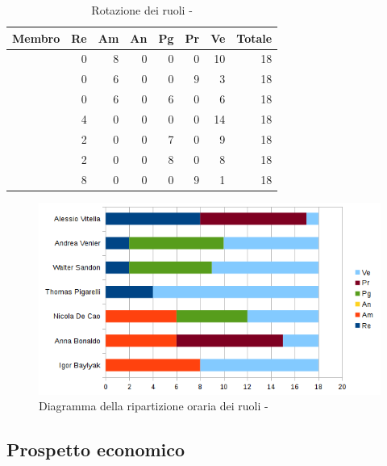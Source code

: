 \documentclass[12pt,a4paper]{article}
\begin{document}
\begin{table}[H]
	\begin{center}
		\begin{tabular}{l r r r r r r r}
			\toprule
			\textbf{Membro}	&	\textbf{Re}	&	\textbf{Am}	& \textbf{An} & \textbf{Pg} & \textbf{Pr} & \textbf{Ve} & \textbf{Totale}\\
			\midrule
			\midrule
			\IB & 0 & 8 & 0 & 0 & 0 & 10 & 18 \\
			\midrule
			\AB & 0 & 6 & 0 & 0 & 9 & 3 & 18 \\
			\midrule
			\NDC & 0 & 6 & 0 & 6 & 0 & 6 & 18 \\
			\midrule
			\TP & 4 & 0 & 0 & 0 & 0 &14 & 18 \\
			\midrule
			\WS & 2 & 0 & 0 & 7 & 0 & 9 & 18 \\
			\midrule
			\AVE & 2 & 0 & 0 & 8 & 0 & 8 & 18 \\
			\midrule
			\AVI & 8 & 0 & 0 & 0 & 9 & 1 & 18 \\
			\bottomrule
		\end{tabular}
		\caption{Rotazione dei ruoli - \FVV}
	\end{center}
\end{table}

\begin{center}
	\begin{figure}[H]
		\centering
		\includegraphics[width=\textwidth]{diagrammaBarreVerificaValidazioneRotazioneRuoli.png}
		\caption{Diagramma della ripartizione oraria dei ruoli - \FVV}
	\end{figure}
\end{center}

\subsection{Prospetto economico}
\end{document}
